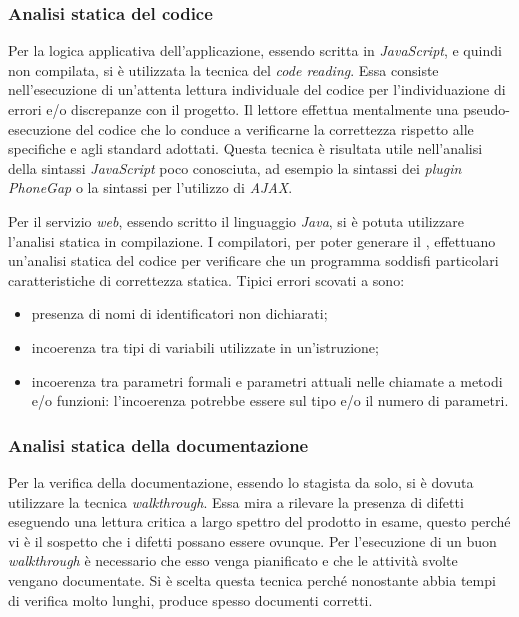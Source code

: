 \subsubsection{Analisi statica del codice}


Per la logica applicativa dell'applicazione, essendo scritta in \textit{JavaScript}, e quindi non compilata, si è utilizzata la tecnica del \textit{code reading}. Essa consiste nell'esecuzione di un'attenta lettura individuale del codice per l'individuazione di errori e/o discrepanze con il progetto. Il lettore effettua mentalmente una pseudo-esecuzione del codice che lo conduce a verificarne la correttezza rispetto alle specifiche e agli standard adottati. Questa tecnica è risultata utile nell'analisi della sintassi \textit{JavaScript} poco conosciuta, ad esempio la sintassi dei \textit{plugin PhoneGap} o la sintassi per l'utilizzo di \textit{AJAX}.


Per il servizio \textit{web}, essendo scritto il linguaggio \textit{Java}, si è potuta utilizzare l'analisi statica in compilazione. I compilatori, per poter generare il , effettuano un'analisi statica del codice per verificare che un programma soddisfi particolari caratteristiche di correttezza statica. Tipici errori scovati a  sono:
\begin{itemize}
	\item presenza di nomi di identificatori non dichiarati;
	\item incoerenza tra tipi di variabili utilizzate in un'istruzione;
	\item incoerenza tra parametri formali e parametri attuali nelle chiamate a metodi e/o funzioni: l'incoerenza potrebbe essere sul tipo e/o il numero di parametri.
\end{itemize}

\subsubsection{Analisi statica della documentazione}

Per la verifica della documentazione, essendo lo stagista da solo, si è dovuta utilizzare la tecnica \textit{walkthrough}. Essa mira a rilevare la presenza di difetti eseguendo una lettura critica a largo spettro del prodotto in esame, questo perché vi è il sospetto che i difetti possano essere ovunque. Per l'esecuzione di un buon \textit{walkthrough} è necessario che esso venga pianificato e che le attività svolte vengano documentate. Si è scelta questa tecnica perché nonostante abbia tempi di verifica molto lunghi, produce spesso documenti corretti.

